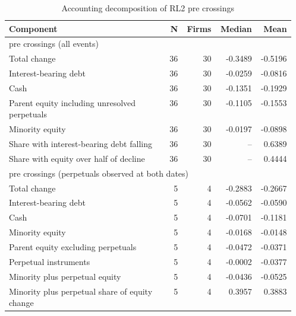 \begin{table}[!htbp]\centering\scriptsize
\caption{Accounting decomposition of RL2 pre crossings }
\begin{threeparttable}
\begin{tabular}{p{0.56\linewidth}rrrr}
\toprule
Component & N & Firms & Median & Mean \\
\midrule
\multicolumn{5}{l}{pre crossings (all events)} \\
Total change & 36 & 30 & -0.3489 & -0.5196 \\
Interest-bearing debt & 36 & 30 & -0.0259 & -0.0816 \\
Cash & 36 & 30 & -0.1351 & -0.1929 \\
Parent equity including unresolved perpetuals & 36 & 30 & -0.1105 & -0.1553 \\
Minority equity & 36 & 30 & -0.0197 & -0.0898 \\
Share with interest-bearing debt falling & 36 & 30 & -- & 0.6389 \\
Share with equity over half of decline & 36 & 30 & -- & 0.4444 \\
\multicolumn{5}{l}{pre crossings (perpetuals observed at both dates)} \\
Total change & 5 & 4 & -0.2883 & -0.2667 \\
Interest-bearing debt & 5 & 4 & -0.0562 & -0.0590 \\
Cash & 5 & 4 & -0.0701 & -0.1181 \\
Minority equity & 5 & 4 & -0.0168 & -0.0148 \\
Parent equity excluding perpetuals & 5 & 4 & -0.0472 & -0.0371 \\
Perpetual instruments & 5 & 4 & -0.0002 & -0.0377 \\
Minority plus perpetual equity & 5 & 4 & -0.0436 & -0.0525 \\
Minority plus perpetual share of equity change & 5 & 4 & 0.3957 & 0.3883 \\
\bottomrule
\end{tabular}
\begin{tablenotes}[flushleft]\footnotesize

\end{tablenotes}
\end{threeparttable}
\end{table}
